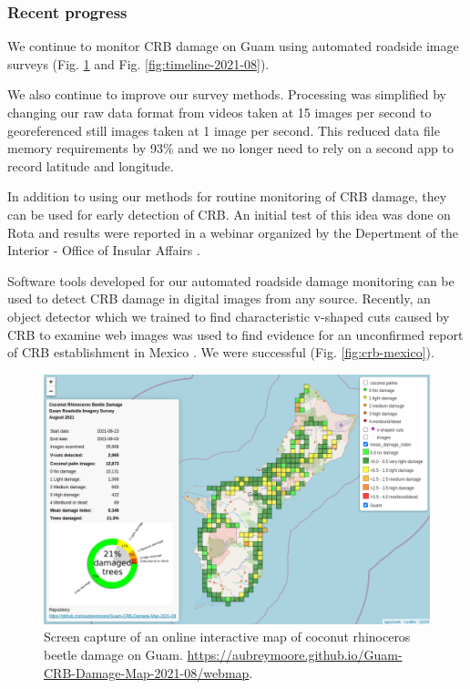 \documentclass[12pt,letterpaper,english,bibliography=totocnumbered, abstract=on]{scrartcl}
\begin{document}
\clearpage

\subsubsection{Recent progress}

We continue to monitor CRB damage on Guam using automated roadside image surveys (Fig. \ref{fig:webmap-2021-08} and Fig. \ref{fig:timeline-2021-08}).

We also continue to improve our survey methods. Processing was simplified by changing our raw data format from videos taken at 15 images per second to georeferenced still images taken at 1 image per second. This reduced data file memory requirements by 93\% and we no longer need to rely on a second app to record latitude and longitude.

In addition to using our methods for routine monitoring of CRB damage, they can be used for early detection of CRB. An initial test of this idea was done on Rota and results were reported in a webinar organized by the Depertment of the Interior - Office of Insular Affairs  \cite{usdepartmentoftheinterior-officeofinsularaffairsYouTubeVideoCoconut2021}.

Software tools developed for our automated roadside damage monitoring can be used to detect CRB damage in digital images from any source. Recently, an object detector which we trained to find characteristic v-shaped cuts caused by CRB to examine web images was used to find evidence for an unconfirmed report of CRB establishment in Mexico \cite{jacksonSocialMediaPosts2022}. We were successful (Fig.  \ref{fig:crb-mexico}).

\begin{figure}[H]
	\centering
	\includegraphics[width=\linewidth]{../images/webmap-2021-08}
	\caption{Screen capture of an online interactive map of coconut rhinoceros beetle damage on Guam. \url{https://aubreymoore.github.io/Guam-CRB-Damage-Map-2021-08/webmap}.}
	\label{fig:webmap-2021-08}
\end{figure}
\end{document}
